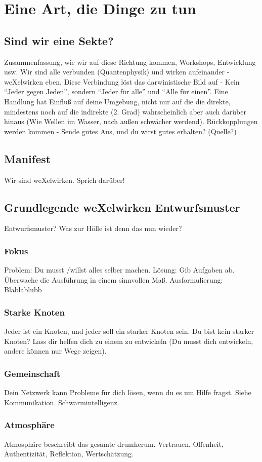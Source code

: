 \chapter{Eine Art, die Dinge zu tun}
  \section{Sind wir eine Sekte?}
Zusammenfassung, wie wir auf diese Richtung kommen, Workshops, Entwicklung usw.
%
Wir sind alle verbunden (Quantenphysik) und wirken aufeinander - weXelwirken eben.
%
Diese Verbindung löst das darwinistische Bild auf - Kein "`Jeder gegen Jeden"', sondern "`Jeder für alle"' und "`Alle für einen"'.
%
Eine Handlung hat Einfluß auf deine Umgebung, nicht nur auf die die direkte, mindestens noch auf die indirekte (2. Grad) wahrscheinlich aber auch darüber hinaus (Wie Wellen im Wasser, nach außen schwächer werdend).
%
Rückkopplungen werden kommen - Sende gutes Aus, und du wirst gutes erhalten? (Quelle?)
  \section{Manifest}
Wir sind weXelwirken. Sprich darüber!
  \section{Grundlegende weXelwirken Entwurfsmuster}
  Entwurfsmuster? Was zur Hölle ist denn das nun wieder?
    \subsection{Fokus}
Problem: Du musst /willst alles selber machen.
%
Lösung: Gib Aufgaben ab. Überwache die Ausführung in einem sinnvollen Maß.
%
Ausformulierung: Blablablubb
    \subsection{Starke Knoten}
Jeder ist ein Knoten, und jeder soll ein starker Knoten sein.
%
Du bist kein starker Knoten?
%
Lass dir helfen dich zu einem zu entwickeln (Du musst dich entwickeln, andere können nur Wege zeigen).
    \subsection{Gemeinschaft}
Dein Netzwerk kann Probleme für dich lösen, wenn du es um Hilfe fragst.
%
Siehe Kommunikation. Schwarmintelligenz.
    \subsection{Atmosphäre}
Atmosphäre beschreibt das gesamte drumherum.
%
Vertrauen, Offenheit, Authentizität, Reflektion, Wertschätzung.
